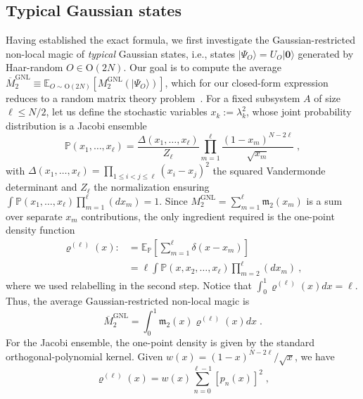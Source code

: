 \documentclass[prx,twocolumn,superscriptaddress,aps,10pt, frontmatterverbose, reprint,footinbib,longbibliography=true]{revtex4-2}
\begin{document}
\subsection{Typical Gaussian states}
Having established the exact formula, we first investigate the Gaussian-restricted non-local magic of \emph{typical} Gaussian states, i.e., states $|\Psi_O\rangle=U_O|\mathbf{0}\rangle$ generated by Haar-random $O\in \mathrm{O}(2N)$.
Our goal is to compute the average $\overline{M}_2^\mathrm{GNL}\equiv \mathbb{E}_{O\sim \mathrm{O}(2N)}[M_2^\mathrm{GNL}(|\Psi_O\rangle)]$, which for our closed-form expression reduces to a random matrix theory problem~\cite{Mehta2004,Livan_2018,vidmar2017entanglement}.
For a fixed subsystem $A$ of size $\ell\le N/2$, let us define the stochastic variables $x_k:=\lambda_k^2$, whose joint probability distribution is a Jacobi ensemble~\cite{Mehta2004,PhysRevB.103.L241118}
\begin{equation}
    \mathbb{P}(x_1,\dots,x_\ell) = \frac{\Delta(x_1,\dots,x_\ell)}{Z_\ell}  \prod_{m=1}^\ell \frac{(1-x_m)^{N-2\ell}}{\sqrt{x_m}}\;,
\end{equation}
with $\Delta(x_1,\dots,x_\ell)=\prod_{1\le i<j\le \ell} (x_i-x_j)^2$ the squared Vandermonde determinant  and $Z_\ell$ the normalization ensuring $\int \mathbb{P}(x_1,\dots,x_\ell)\prod_{m=1}^\ell (dx_m)=1$. 
Since $M_2^\mathrm{GNL}=\sum_{m=1}^\ell \mathfrak{m}_2(x_m)$ is a sum over separate $x_m$ contributions, the only ingredient required is the one-point density function 
\begin{equation}
\begin{split}
    \varrho^{(\ell)}(x):&=\mathbb{E}_\mathbb{P}\left[\sum_{m=1}^\ell \delta(x-x_m)\right] \\&= \ell \int \mathbb{P}(x,x_2,\dots,x_\ell)\prod_{m=2}^\ell (dx_m)\:,
\end{split}
\end{equation}
where we used relabelling in the second step. Notice that $\int_0^1 \varrho^{(\ell)}(x) dx = \ell$.
Thus, the average Gaussian-restricted non-local magic is 
\begin{equation}
    \overline{M}_2^\mathrm{GNL}=\int_0^1 \mathfrak{m}_2(x) \varrho^{(\ell)}(x) dx\;.
\end{equation}
For the Jacobi ensemble, the one-point density is given by the standard orthogonal-polynomial kernel.
Given $w(x) = (1-x)^{N-2\ell}/\sqrt{x}$, we have~\cite{sierant2026theorymatchgatecommutant,sierant2026fermionic}
\begin{equation}
\varrho^{(\ell)}(x) = w(x) \sum_{n=0}^{\ell-1} [p_n(x)]^2\;,
\label{eq:ziopino}
\end{equation}
\end{document}

